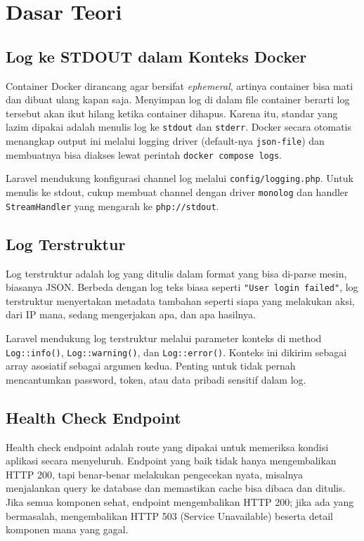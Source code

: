 \documentclass[a4paper,oneside,11pt]{book}
\begin{document}
\chapter{Dasar Teori}

\section{Log ke STDOUT dalam Konteks Docker}

Container Docker dirancang agar bersifat \textit{ephemeral}, artinya container bisa mati dan
dibuat ulang kapan saja. Menyimpan log di dalam file container berarti log tersebut akan ikut
hilang ketika container dihapus. Karena itu, standar yang lazim dipakai adalah menulis log
ke \texttt{stdout} dan \texttt{stderr}. Docker secara otomatis menangkap output ini melalui
logging driver (default-nya \texttt{json-file}) dan membuatnya bisa diakses lewat perintah
\texttt{docker compose logs}.

Laravel mendukung konfigurasi channel log melalui \texttt{config/logging.php}. Untuk menulis
ke stdout, cukup membuat channel dengan driver \texttt{monolog} dan handler
\texttt{StreamHandler} yang mengarah ke \texttt{php://stdout}.

\section{Log Terstruktur}

Log terstruktur adalah log yang ditulis dalam format yang bisa di-parse mesin, biasanya JSON.
Berbeda dengan log teks biasa seperti \texttt{"User login failed"}, log terstruktur menyertakan
metadata tambahan seperti siapa yang melakukan aksi, dari IP mana, sedang mengerjakan apa,
dan apa hasilnya.

Laravel mendukung log terstruktur melalui parameter konteks di method \texttt{Log::info()},
\texttt{Log::warning()}, dan \texttt{Log::error()}. Konteks ini dikirim sebagai array asosiatif
sebagai argumen kedua. Penting untuk tidak pernah mencantumkan password, token, atau data
pribadi sensitif dalam log.

\section{Health Check Endpoint}

Health check endpoint adalah route yang dipakai untuk memeriksa kondisi aplikasi secara
menyeluruh. Endpoint yang baik tidak hanya mengembalikan HTTP 200, tapi benar-benar melakukan
pengecekan nyata, misalnya menjalankan query ke database dan memastikan cache bisa dibaca dan
ditulis. Jika semua komponen sehat, endpoint mengembalikan HTTP 200; jika ada yang bermasalah,
mengembalikan HTTP 503 (Service Unavailable) beserta detail komponen mana yang gagal.
\end{document}
